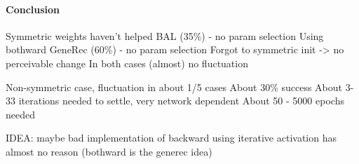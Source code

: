 \paragraph{Conclusion} 
Symmetric weights haven't helped BAL (35\%) - no param selection
Using bothward GeneRec (60\%) - no param selection 
  Forgot to symmetric init -> no perceivable change 
In both cases (almost) no fluctuation 

Non-symmetric case, fluctuation in about 1/5 cases 
  About 30\% success 
  About 3-33 iterations needed to settle, very network dependent 
  About 50 - 5000 epochs needed 

IDEA: maybe bad implementation of backward
      using iterative activation has almost no reason (bothward is the generec idea) 

